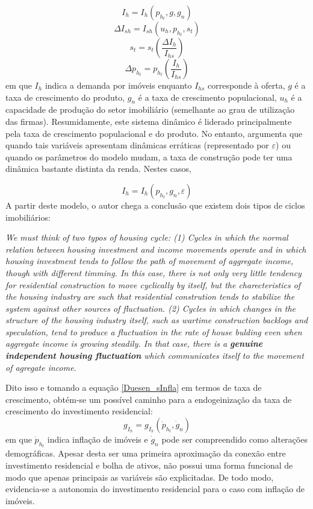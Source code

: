$$
I_{h} = I_h(p_{h_t}, g, g_n)
$$
$$
\Delta I_{sh} =  I_{sh}(u_h, p_{h_t}, s_t)
$$
$$
s_t = s_t\left(\frac{\Delta I_{h}}{I_{hs}}\right)
$$
$$
\Delta p_{h_t} = p_{h_t}\left(\frac{I_{h}}{I_{hs}}\right)
$$
em que $I_h$ indica a demanda por imóveis enquanto $I_{hs}$ corresponde à oferta, $g$ é a taxa de crescimento do produto, $g_n$ é a taxa de crescimento populacional,
$u_h$ é a capacidade de produção do setor imobiliário (semelhante ao grau de utilização das firmas).
Resumidamente, este sistema dinâmico é liderado principalmente pela taxa de crescimento populacional e do produto. No entanto, argumenta que quando tais variáveis apresentam dinâmicas erráticas (representado por $\varepsilon$) ou quando os parâmetros do modelo mudam, a taxa de construção pode ter uma dinâmica bastante distinta da renda. Nestes casos,

\begin{equation}
\label{Duesen_sInfla}
I_h = I_h(p_{h_t}, g_n, \varepsilon)
\end{equation}
A partir deste modelo, o autor chega a conclusão que existem dois tipos de ciclos imobiliários:
\begin{citacao}
\textit{We must think of two typos of housing cycle: (1) Cycles in which the normal relation between housing investment and income movements operate and  in which housing investment tends to follow the path of movement of aggregate income, though with different timming.
In this case, there is not only very little tendency for residential construction to move cyclically by itself, but the charecteristics of the housing industry are such that residential constrution tends to  stabilize the system against other sources of fluctuation.
(2) Cycles in which changes in the structure of the housing industry itself, such as wartime construction backlogs and speculation, tend to produce a fluctuation in the rate of house bulding even when aggregate income is growing steadily. 
In that case, there is a \textbf{genuine independent housing fluctuation} which communicates itself to the movement of agregate income.}
\cite[p.~164. grifos adicionados]{duesenberry_investment_1958}
\end{citacao}
Dito isso e tomando a equação \ref{Duesen_sInfla} em termos de taxa de crescimento, obtém-se um possível caminho para a endogeinização da taxa de crescimento do investimento residencial:
\begin{equation}
g_{I_h} = g_{I_h}(\dot p_{h_t}, \dot g_n)
\end{equation}
em que $\dot p_{h_t}$ indica inflação de imóveis e $\dot g_n$ pode ser compreendido como alterações demográficas.
Apesar desta ser uma primeira aproximação da conexão entre investimento residencial e bolha de ativos, não possui uma forma funcional de modo que apenas principais as variáveis são explicitadas.
De todo modo, evidencia-se a autonomia do investimento residencial para o caso com inflação de imóveis.

